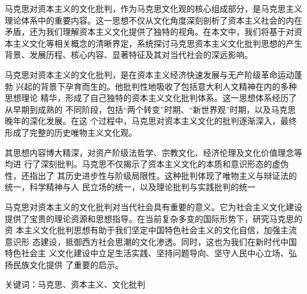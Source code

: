马克思对资本主义的文化批判，作为马克思文化观的核心组成部分，是马克思主义
理论体系中的重要内容。这一思想不仅从文化角度深刻剖析了资本主义社会的内在
矛盾，还为我们理解资本主义文化提供了独特的视角。在本文中，我们将基于对资
本主义文化等相关概念的清晰界定，系统探讨马克思资本主义文化批判思想的产生
背景、发展历程、核心内容、显著特征及其对当代社会的深远影响。

马克思对资本主义的文化批判，是在资本主义经济快速发展与无产阶级革命运动蓬勃
兴起的背景下孕育而生的。他批判性地吸收了包括意大利人文精神在内的多种思想理论
精华，形成了自己独特的资本主义文化批判体系。这一思想体系经历了从早期到成熟的
不同阶段，包括“两个转变”时期、“新世界观”时期，以及马克思晚年的深化发展。在这
个过程中，马克思对资本主义文化的批判逐渐深入，最终形成了完整的历史唯物主义文化观。

其思想内容博大精深，对资产阶级法哲学、宗教文化、经济伦理及文化价值理念等均进
行了深刻批判。马克思不仅揭示了资本主义文化的本质和意识形态的虚伪性，还指出了
其历史进步性与阶级局限性。这种批判体现了唯物主义与辩证法的统一，科学精神与人
民立场的统一，以及理论批判与实践批判的统一


马克思对资本主义的文化批判对当代社会具有重要的意义。它为社会主义文化建设
提供了宝贵的理论资源和思想指导。在当前复杂多变的国际形势下，研究马克思的资
本主义文化批判思想有助于我们坚定中国特色社会主义的文化自信，加强主流意识形
态建设，抵御西方社会思潮的文化渗透。同时，这也为我们在新时代中国特色社会主
义文化建设中立足生活实践、坚持问题导向、坚守人民中心立场、弘扬民族文化提供
了重要的启示。\\[5pt]

{
    \raggedright\heiti\fontsize{13pt}{17pt}\selectfont 
    关键词：马克思、资本主义、文化批判
    }